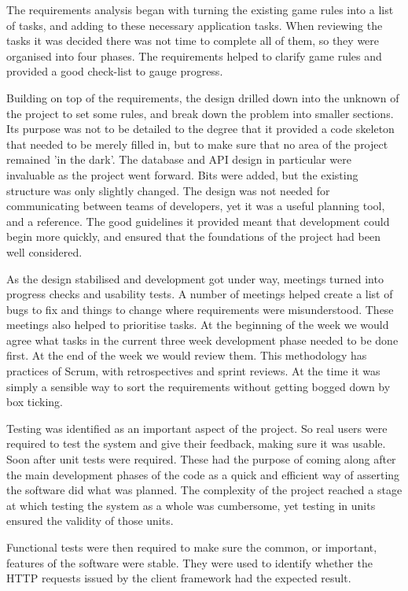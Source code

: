 The requirements analysis began with turning the existing game rules into a list of tasks, and adding to these necessary application tasks. When reviewing the tasks it was decided there was not time to complete all of them, so they were organised into four phases. The requirements helped to clarify game rules and provided a good check-list to gauge progress.

Building on top of the requirements, the design drilled down into the unknown of the project to set some rules, and break down the problem into smaller sections. Its purpose was not to be detailed to the degree that it provided a code skeleton that needed to be merely filled in, but to make sure that no area of the project remained 'in the dark'. The database and API design in particular were invaluable as the project went forward. Bits were added, but the existing structure was only slightly changed. The design was not needed for communicating between teams of developers, yet it was a useful planning tool, and a reference. The good guidelines it provided meant that development could begin more quickly, and ensured that the foundations of the project had been well considered.

As the design stabilised and development got under way, meetings turned into progress checks and usability tests. A number of meetings helped create a list of bugs to fix and things to change where requirements were misunderstood. These meetings also helped to prioritise tasks. At the beginning of the week we would agree what tasks in the current three week development phase needed to be done first. At the end of the week we would review them. This methodology has practices of Scrum, with retrospectives and sprint reviews. At the time it was simply a sensible way to sort the requirements without getting bogged down by box ticking.

Testing was identified as an important aspect of the project. So real users were required to test the system and give their feedback, making sure it was usable. Soon after unit tests were required. These had the purpose of coming along after the main development phases of the code as a quick and efficient way of asserting the software did what was planned. The complexity of the project reached a stage at which testing the system as a whole was cumbersome, yet testing in units ensured the validity of those units.

Functional tests were then required to make sure the common, or important, features of the software were stable. They were used to identify whether the HTTP requests issued by the client framework had the expected result.

